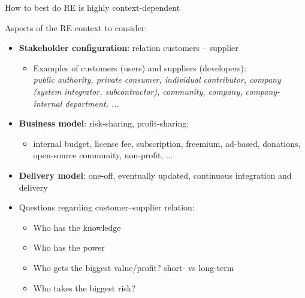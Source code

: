 \begin{Slide}{How to best do RE is highly context-dependent}

Aspects of the RE context to consider: 
\begin{itemize}
\item \textbf{Stakeholder configuration}: relation customers -- supplier  
\begin{itemize}
\item Examples of customers (users) and suppliers (developers): \\
    \textit{public authority, private consumer, individual contributor, company (system integrator, subcontractor), community, company, company-internal department, ...}
\end{itemize}
\item \textbf{Business model}: risk-sharing, profit-sharing: \\
\begin{itemize}
\item internal budget, license fee, subscription, freemium, ad-based, donations, open-source community, non-profit, ... 
\end{itemize}
\item \textbf{Delivery model}: one-off, eventually updated, continuous integration and delivery

\item Questions regarding customer--supplier relation:
\begin{itemize}
\item Who has the knowledge
\item Who has the power
\item Who gets the biggest value/profit? short- vs long-term
\item Who takes the biggest risk?
 

\end{itemize}
\end{itemize}
\end{Slide}